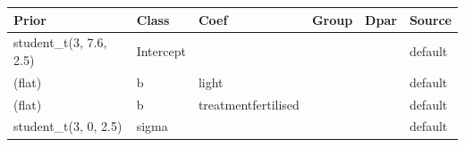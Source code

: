 \begin{tabular}{llllll}
  \toprule
  \textbf{Prior} & \textbf{Class} & \textbf{Coef} & \textbf{Group} & \textbf{Dpar} & \textbf{Source} \\
  \midrule
  student\_t(3, 7.6, 2.5) & Intercept &  &  &  & default \\
  (flat) & b & light &  &  & default \\
  (flat) & b & treatmentfertilised &  &  & default \\
  student\_t(3, 0, 2.5) & sigma &  &  &  & default \\
  \bottomrule
\end{tabular}
